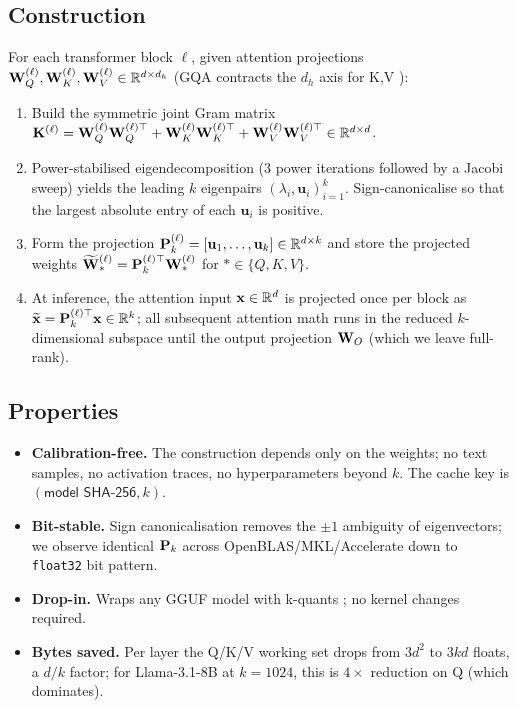 \documentclass[11pt]{article}
\begin{document}
\subsection{Construction}
For each transformer block $\ell$, given attention projections
$\mathbf{W}_Q^{(\ell)},\mathbf{W}_K^{(\ell)},\mathbf{W}_V^{(\ell)}\in\mathbb{R}^{d\times d_h}$
(GQA contracts the $d_h$ axis for K,V \cite{ainslie2023gqa}):
\begin{enumerate}
\item Build the symmetric joint Gram matrix
$\mathbf{K}^{(\ell)} = \mathbf{W}_Q^{(\ell)}\mathbf{W}_Q^{(\ell)\top}+\mathbf{W}_K^{(\ell)}\mathbf{W}_K^{(\ell)\top}+\mathbf{W}_V^{(\ell)}\mathbf{W}_V^{(\ell)\top}\in\mathbb{R}^{d\times d}$.
\item Power-stabilised eigendecomposition (3 power iterations followed by a
Jacobi sweep) yields the leading $k$ eigenpairs
$(\lambda_i,\mathbf{u}_i)_{i=1}^k$.  Sign-canonicalise so that the largest
absolute entry of each $\mathbf{u}_i$ is positive.
\item Form the projection $\mathbf{P}_k^{(\ell)}=[\mathbf{u}_1,\dots,\mathbf{u}_k]
\in\mathbb{R}^{d\times k}$ and store the projected weights
$\widetilde{\mathbf{W}}_*^{(\ell)} = \mathbf{P}_k^{(\ell)\top}\mathbf{W}_*^{(\ell)}$ for
$*\in\{Q,K,V\}$.
\item At inference, the attention input $\mathbf{x}\in\mathbb{R}^d$ is projected once
per block as $\widetilde{\mathbf{x}} = \mathbf{P}_k^{(\ell)\top}\mathbf{x}\in\mathbb{R}^k$;
all subsequent attention math runs in the reduced $k$-dimensional subspace
until the output projection $\mathbf{W}_O$ (which we leave full-rank).
\end{enumerate}

\subsection{Properties}
\begin{itemize}
\item \textbf{Calibration-free.}  The construction depends only on the
weights; no text samples, no activation traces, no hyperparameters beyond
$k$.  The cache key is $(\textsf{model SHA-256}, k)$.
\item \textbf{Bit-stable.}  Sign canonicalisation removes the
$\pm1$ ambiguity of eigenvectors; we observe identical $\mathbf{P}_k$ across
OpenBLAS/MKL/Accelerate down to \texttt{float32} bit pattern.
\item \textbf{Drop-in.}  Wraps any GGUF \cite{ggerganov2023gguf} model with
k-quants \cite{ggerganov2023kquants}; no kernel changes required.
\item \textbf{Bytes saved.}  Per layer the Q/K/V working set drops from
$3d^2$ to $3kd$ floats, a $d/k$ factor; for Llama-3.1-8B at $k{=}1024$, this
is $4\times$ reduction on Q (which dominates).
\end{itemize}
\end{document}
